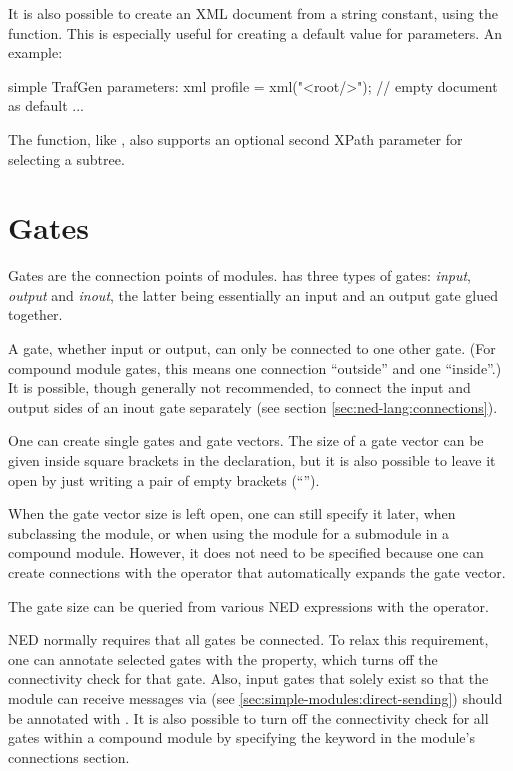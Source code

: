It is also possible to create an XML document from a string constant, using
the  function. This is especially useful for creating a
default value for  parameters. An example:

\begin{ned}
simple TrafGen {
    parameters:
        xml profile = xml("<root/>"); // empty document as default
        ...
}
\end{ned}

The  function, like , also supports an
optional second XPath parameter for selecting a subtree.




\section{Gates}
\label{sec:ned-lang:gates}

Gates are the connection points of modules.  {\opp} has three types of
gates: \textit{input}, \textit{output} and \textit{inout}, the latter being
essentially an input and an output gate glued together.

A gate, whether input or output, can only be connected to one other
gate. (For compound module gates, this means one connection ``outside'' and
one ``inside''.)  It is possible, though generally not recommended, to
connect the input and output sides of an inout gate separately (see section
\ref{sec:ned-lang:connections}).

One can create single gates and gate vectors. The size of a gate vector
can be given inside square brackets in the declaration, but it is also possible
to leave it open by just writing a pair of empty brackets (``\ttt{[]}'').

When the gate vector size is left open, one can still specify it later,
when subclassing the module, or when using the module for a submodule in a
compound module. However, it does not need to be specified because
one can create connections with the  operator that
automatically expands the gate vector.

The gate size can be queried from various NED expressions with the
 operator.

NED normally requires that all gates be connected. To relax this
requirement, one can annotate selected gates with the 
property, which turns off the connectivity check for that gate. Also, input
gates that solely exist so that the module can receive messages via
 (see \ref{sec:simple-modules:direct-sending}) should
be annotated with . It is also possible to turn off the connectivity
check for all gates within a compound module by specifying the
 keyword in the module's connections section.

